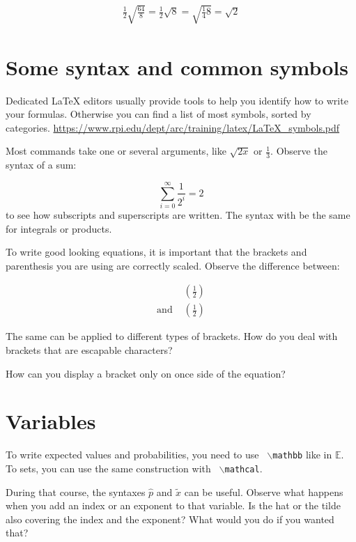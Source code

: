\documentclass{article}
\begin{document}
	\begin{align}
		\frac{1}{2}\sqrt{\frac{64}{8}}  = 	\frac{1}{2}\sqrt{8} = 	\sqrt{\frac{1}{4}8} = \sqrt{2}
	\end{align}
	
	
	
	
	
	\section{Some syntax and common symbols}
	
	Dedicated \LaTeX{} editors usually provide tools to help you identify how to write your formulas. Otherwise you can find a list of most symbols, sorted by categories.
	\url{https://www.rpi.edu/dept/arc/training/latex/LaTeX_symbols.pdf}
	
	Most commands take one or several arguments, like \(\sqrt{2x} \) or \(\frac{1}{3}\). 
	Observe the syntax of a sum:
	
	\[ \sum_{i = 0}^\infty \frac{1}{2^i} = 2
	\]
	to see how subscripts and superscripts are written. The syntax with be the same for integrals or products.
	
	
	To write good looking equations, it is important that the brackets and parenthesis you are using are correctly scaled. Observe the difference between:
	
	\begin{align}
		& (\frac{1}{2}) \\
		\text{and } 
		&\left(\frac{1}{2}\right)
	\end{align}
	
	The same can be applied to different types of brackets. How do you deal with brackets that are escapable characters?
	
	How can you display a bracket only on once side of the equation?
	
	
	\section{Variables}
	
	To write expected values and probabilities, you need to use \texttt{ \(\backslash \)mathbb} like in  
	\( \mathbb{E} \). To sets, you can use the same construction with \texttt{ \(\backslash \)mathcal}.

	During that course, the syntaxes $\hat p$	and $\tilde x$ can be useful. Observe what happens when you add an index or an exponent to that variable. Is the hat or the tilde also covering the index and the exponent? What would you do if you wanted that?
	
\end{document}
